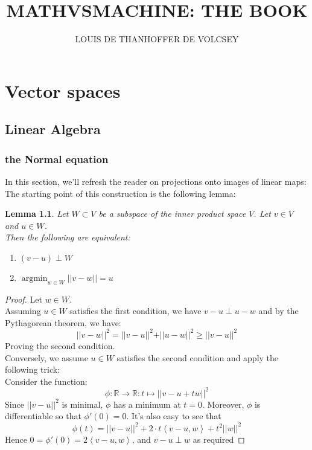 \documentclass{book}
\theoremstyle{plain}
\newtheorem{lemma}[corollary]{Lemma}
\theoremstyle{definition}
\DeclareMathOperator{\argmin}{argmin}
\newcommand{\bl}[2]{\left\langle #1,#2\right\rangle}
\renewcommand{\d}[1]{\mathbb{#1}}
\newcommand{\fun}{\mapsto}
\newcommand{\norm}[1]{\vert \vert #1 \vert \vert}
\newcommand{\mor}{\longrightarrow}
\begin{document}
\title{\textbf{MATHVSMACHINE: THE BOOK}}
\author{LOUIS DE THANHOFFER DE VOLCSEY}
\date{}
\maketitle	


\noindent\hrulefill
\tableofcontents{}
\noindent\hrulefill


\part{Vector spaces}
\chapter{Linear Algebra}
\section{the Normal equation}


\noindent In this section, we'll refresh the reader on projections onto images of linear maps: The starting point of this construction is the following lemma:
\begin{lemma}\label{lem:mindist-perp}
	Let $W\subset V$ be a subspace of the inner product space $V$. Let $v \in V$ and $u \in W$.\\
	Then the  following are equivalent:
	\begin{enumerate}
		\item $(v-u) \perp W$
		\item $	\argmin_{w \in W}\norm{v-w} =u$	
	\end{enumerate}
\end{lemma}

\begin{proof}
	Let $w \in W$.\\
	Assuming $u \in W$ satisfies the first condition, we have $v-u \perp u-w$ and by the Pythagorean theorem, we have:
	\[
	\norm{v-w}^2 = \norm{v-u}^2+\norm{u-w}^2 \ge \norm{v-u}^2
	\]
	Proving the second condition.\\ 
	Conversely, we assume $u\in W$ satisfies the second condition and apply the following trick:\\
	Consider the function:
	\[
	\phi:\d{R}\mor \d{R}: t \fun \norm{v-u+tw}^2
	\]	
	Since $\norm{v-u}^2$ is minimal, $\phi$ has a minimum at $t=0$. Moreover, $\phi$ is differentiable so that $\phi'(0)=0$. It's also easy to see that
	\[
	\phi(t) = \norm{v-u}^2 +2\cdot t \bl{v-u}{w}+t^2\norm{w}^2
	\]
	Hence $0=\phi'(0) = 2 \bl{v-u}{w}$, and $v-u\perp w$ as required
\end{proof}
\end{document}
